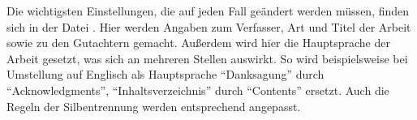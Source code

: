 Die wichtigsten Einstellungen, die auf jeden Fall geändert werden müssen,
finden sich in der Datei .
Hier werden \ua Angaben zum Verfasser, Art und Titel der Arbeit sowie zu den Gutachtern gemacht.
Außerdem wird hier die Hauptsprache der Arbeit gesetzt, was sich an mehreren Stellen auswirkt.
So wird beispielsweise bei Umstellung auf Englisch als Hauptsprache
\enquote{Danksagung} durch \enquote{Acknowledgments},
\enquote{Inhaltsverzeichnis} durch \enquote{Contents}
\usw ersetzt.
Auch die Regeln der Silbentrennung werden entsprechend angepasst.
